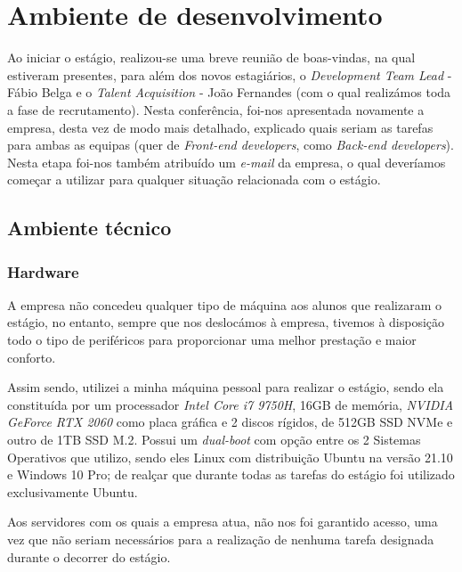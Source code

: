 \documentclass{article}
\begin{document}
\cleardoublepage
\section{Ambiente de desenvolvimento}
\label{sec:amb-dev}
\hspace*{0.5cm} Ao iniciar o estágio, realizou-se uma breve reunião de boas-vindas, na qual estiveram presentes, para além dos novos estagiários, o \emph{Development Team Lead} - Fábio Belga e o \emph{Talent Acquisition} - João Fernandes (com o qual realizámos toda a fase de recrutamento). Nesta conferência, foi-nos apresentada novamente a empresa, desta vez de modo mais detalhado, explicado quais seriam as tarefas para ambas as equipas (quer de \emph{Front-end developers}, como \emph{Back-end developers}). Nesta etapa foi-nos também atribuído um \emph{e-mail} da empresa, o qual deveríamos começar a utilizar para qualquer situação relacionada com o estágio. \newline

\subsection{Ambiente técnico}
\subsubsection{Hardware}
\hspace*{0.5cm} A empresa não concedeu qualquer tipo de máquina aos alunos que realizaram o estágio, no entanto, sempre que nos deslocámos à empresa, tivemos à disposição todo o tipo de periféricos para proporcionar uma melhor prestação e maior conforto. \newline

\hspace*{0.5cm} Assim sendo, utilizei a minha máquina pessoal para realizar o estágio, sendo ela constituída por um processador \emph{Intel Core i7 9750H}, 16GB de memória, \emph{NVIDIA GeForce RTX 2060} como placa gráfica e 2 discos rígidos, de 512GB SSD NVMe e outro de 1TB SSD M.2. Possui um \emph{dual-boot} com opção entre os 2 Sistemas Operativos que utilizo, sendo eles Linux com distribuição Ubuntu na versão 21.10 e Windows 10 Pro; de realçar que durante todas as tarefas do estágio foi utilizado exclusivamente Ubuntu. \newline

\hspace*{0.5cm} Aos servidores com os quais a empresa atua, não nos foi garantido acesso, uma vez que não seriam necessários para a realização de nenhuma tarefa designada durante o decorrer do estágio. \newline
\end{document}
